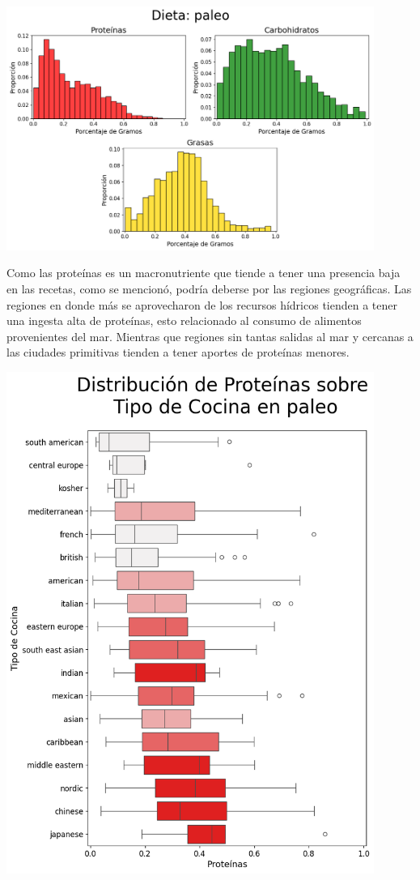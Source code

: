 \documentclass[12pt,a4paper]{article}
\begin{document}
            \begin{center}
                \includegraphics[width=0.90\textwidth]{Resources/2_03_plot_04.png}
            \end{center}

            Como las proteínas es un macronutriente que tiende a tener una presencia 
            baja en las recetas, como se mencionó, podría deberse por las regiones geográficas. 
            Las regiones en donde más se aprovecharon de los recursos hídricos tienden a tener 
            una ingesta alta de proteínas, esto relacionado al consumo de alimentos provenientes 
            del mar. Mientras que regiones sin tantas salidas al mar y cercanas a las ciudades 
            primitivas tienden a tener aportes de proteínas	menores.

            \begin{center}
                \includegraphics[width=0.90\textwidth]{Resources/2_03_plot_04_2.png}
            \end{center}
\end{document}
